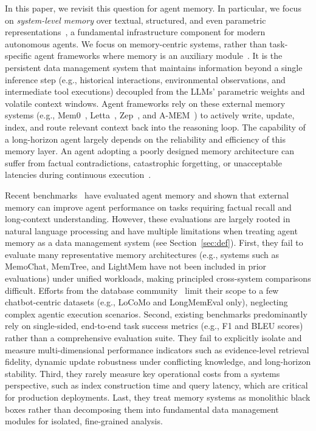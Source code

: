 \documentclass{llmxive}
\begin{document}
In this paper, we revisit this question for agent memory. In particular, we focus on \textit{system-level memory} over textual, structured, and even parametric representations~\cite{chhikara2025mem0,packer2023memgpt,rasmussen2025zep,xu2025amem}, a fundamental infrastructure component for modern autonomous agents.
We focus on memory-centric systems, rather than task-specific agent frameworks where memory is an auxiliary module~\cite{claudecode, zhou2026dbcooker}.
It is the persistent data management system that maintains information beyond a single inference step (e.g., historical interactions, environmental observations, and intermediate tool executions) decoupled from the LLMs' parametric weights and volatile context windows. Agent frameworks rely on these external memory systems (e.g., Mem0~\cite{chhikara2025mem0}, Letta~\cite{packer2023memgpt}, Zep~\cite{rasmussen2025zep}, and A-MEM~\cite{xu2025amem}) to actively write, update, index, and route relevant context back into the reasoning loop. The capability of a long-horizon agent largely depends on the reliability and efficiency of this memory layer. An agent adopting a poorly designed memory architecture can suffer from factual contradictions, catastrophic forgetting, or unacceptable latencies during continuous execution~\cite{du2026memory,zheng2025lifelong}.

Recent benchmarks~\cite{maharana2024locomo,wu2024longmemeval,memoryagentbench2026,membench} have evaluated agent memory and shown that external memory can improve agent performance on tasks requiring factual recall and long-context understanding. However, these evaluations are largely rooted in natural language processing and have multiple limitations when treating agent memory as a data management system (see Section~\ref{sec:def}). 
First, they fail to evaluate many representative memory architectures (e.g., systems such as MemoChat, MemTree, and LightMem have not been included in prior evaluations) under unified workloads, making principled cross-system comparisons difficult. Efforts from the database community~\cite{wu2026memoryeab} limit their scope to a few chatbot-centric datasets (e.g., LoCoMo and LongMemEval only), neglecting complex agentic execution scenarios. 
Second, existing benchmarks predominantly rely on single-sided, end-to-end task success metrics (e.g., F1 and BLEU scores) rather than a comprehensive evaluation suite. They fail to explicitly isolate and measure multi-dimensional performance indicators such as evidence-level retrieval fidelity, dynamic update robustness under conflicting knowledge, and long-horizon stability. 
Third, they rarely measure key operational costs from a systems perspective, such as index construction time and query latency, which are critical for production deployments.
Last, they treat memory systems as monolithic black boxes rather than decomposing them into fundamental data management modules for isolated, fine-grained analysis.
\end{document}
